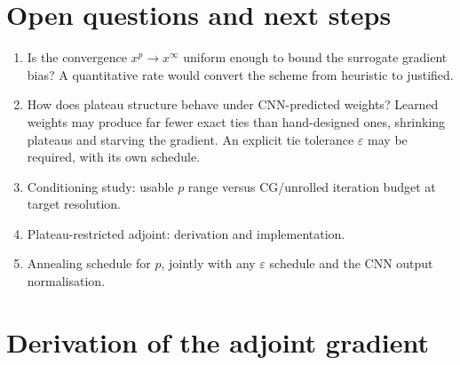 \documentclass[11pt,a4paper]{article}
\theoremstyle{definition}
\begin{document}
\section{Open questions and next steps}
\label{sec:open}

\begin{enumerate}
  \item Is the convergence $x^{p}\to x^{\infty}$ uniform enough to bound
    the surrogate gradient bias? A quantitative rate would convert the
    scheme from heuristic to justified.
  \item How does plateau structure behave under CNN-predicted weights?
    Learned weights may produce far fewer exact ties than hand-designed
    ones, shrinking plateaus and starving the gradient. An explicit tie
    tolerance $\varepsilon$ may be required, with its own schedule.
  \item Conditioning study: usable $p$ range versus CG/unrolled iteration
    budget at target resolution.
  \item Plateau-restricted adjoint: derivation and implementation.
  \item Annealing schedule for $p$, jointly with any $\varepsilon$
    schedule and the CNN output normalisation.
\end{enumerate}

\appendix
\section{Derivation of the adjoint gradient}
\label{app:adjoint}
\end{document}
